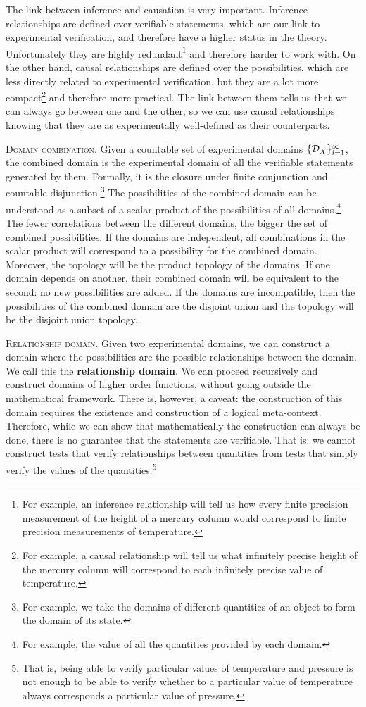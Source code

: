 \documentclass[10pt,twocolumn, nofootinbib]{revtex4-1}
\newcommand\partitle[1]{\textsc{#1}.}
\begin{document}
The link between inference and causation is very important. Inference relationships are defined over verifiable statements, which are our link to experimental verification, and therefore have a higher status in the theory. Unfortunately they are highly redundant\footnote{For example, an inference relationship will tell us how every finite precision measurement of the height of a mercury column would correspond to finite precision measurements of temperature.} and therefore harder to work with. On the other hand, causal relationships are defined over the possibilities, which are less directly related to experimental verification, but they are a lot more compact\footnote{For example, a causal relationship will tell us what infinitely precise height of the mercury column will correspond to each infinitely precise value of temperature.} and therefore more practical. The link between them tells us that we can always go between one and the other, so we can use causal relationships knowing that they are as experimentally well-defined as their counterparts.

\partitle{Domain combination} Given a countable set of experimental domains $\{\mathcal{D}_X\}_{i=1}^{\infty}$, the combined domain is the experimental domain of all the verifiable statements generated by them. Formally, it is the closure under finite conjunction and countable disjunction.\footnote{For example, we take the domains of different quantities of an object to form the domain of its state.} The possibilities of the combined domain can be understood as a subset of a scalar product of the possibilities of all domains.\footnote{For example, the value of all the quantities provided by each domain.} The fewer correlations between the different domains, the bigger the set of combined possibilities. If the domains are independent, all combinations in the scalar product will correspond to a possibility for the combined domain. Moreover, the topology will be the product topology of the domains. If one domain depends on another, their combined domain will be equivalent to the second: no new possibilities are added. If the domains are incompatible, then the possibilities of the combined domain are the disjoint union and the topology will be the disjoint union topology.

\partitle{Relationship domain} Given two experimental domains, we can construct a domain where the possibilities are the possible relationships between the domain. We call this the \textbf{relationship domain}. We can proceed recursively and construct domains of higher order functions, without going outside the mathematical framework. There is, however, a caveat: the construction of this domain requires the existence and construction of a logical meta-context. Therefore, while we can show that mathematically the construction can always be done, there is no guarantee that the statements are verifiable. That is: we cannot construct tests that verify relationships between quantities from tests that simply verify the values of the quantities.\footnote{That is, being able to verify particular values of temperature and pressure is not enough to be able to verify whether to a particular value of temperature always corresponds a particular value of pressure.}


\end{document}
